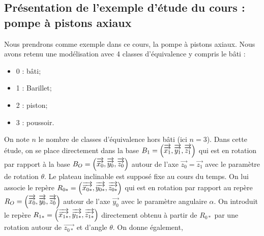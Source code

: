 \documentclass[10pt,fleqn]{article} %
\begin{document}
\def\pathfig{images}

\vspace{4.5cm}
\pagestyle{fancy}
\thispagestyle{plain}

\def\columnseprulecolor{\color{ocre}}
\setlength{\columnseprule}{0.4pt} 

\def\pathfig{images}


\ifprof
\begin{multicols}{2}
\else
\begin{multicols}{2}
\fi





\subsection{Présentation de l'exemple d'étude du cours : pompe à pistons axiaux}
Nous prendrons comme exemple dans ce cours, la pompe à pistons axiaux. Nous avons retenu une modélisation avec 4 classes d'équivalence y compris le bâti :

\begin{itemize}
\item 0 : bâti;
\item 1 : Barillet;
\item 2 : piston;
\item 3 : poussoir.
\end{itemize}

On note $n$ le nombre de classes d'équivalence hors bâti (ici $n=3$).
Dans cette étude, on se place directement dans la base $B_{1}=\left(\overrightarrow{\overrightarrow{x_{1}}},\overrightarrow{\overrightarrow{y_{1}}},\overrightarrow{\overrightarrow{z_{1}}} \right)$ qui est en rotation par rapport à la base $B_{O}=\left(\overrightarrow{\overrightarrow{x_{0}}},\overrightarrow{\overrightarrow{y_{0}}},\overrightarrow{\overrightarrow{z_{0}}} \right)$ autour de l'axe $\overrightarrow{z_{0}}=\overrightarrow{z_{1}}$ avec le paramètre de rotation $\theta$.
Le plateau inclinable est supposé fixe au cours du temps. On lui associe le repère $R_{0*}=\left(\overrightarrow{\overrightarrow{x_{0*}}},\overrightarrow{\overrightarrow{y_{0*}}},\overrightarrow{\overrightarrow{z_{0*}}} \right)$ qui est en rotation par rapport au repère $R_{O}=\left(\overrightarrow{\overrightarrow{x_{0}}},\overrightarrow{\overrightarrow{y_{0}}},\overrightarrow{\overrightarrow{z_{0}}} \right)$ autour de l'axe $\overrightarrow{y_{0}}$ avec le paramètre angulaire $\alpha$. On introduit le repère $R_{1*}=\left(\overrightarrow{\overrightarrow{x_{1*}}},\overrightarrow{\overrightarrow{y_{1*}}},\overrightarrow{\overrightarrow{z_{1*}}} \right)$ directement obtenu à partir de $R_{0*}$ par une rotation autour de $\overrightarrow{z_{0*}}$ et d'angle $\theta$.
On donne également,


\end{multicols}
\end{multicols}
\end{document}
